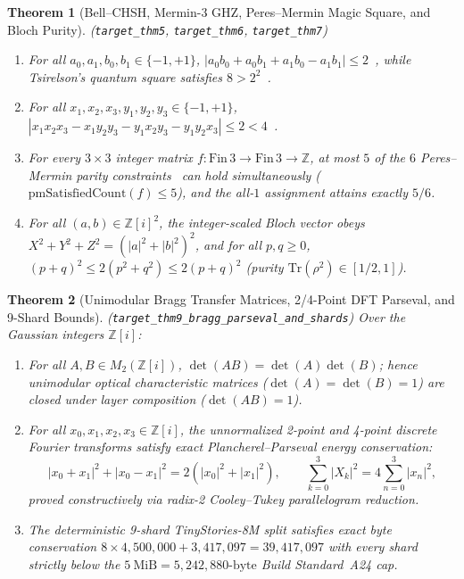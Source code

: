 \documentclass[11pt,a4paper]{amsart}
\newcommand{\code}[1]{{\small\nolinkurl{#1}}}
\newtheorem{theorem}{Theorem}[section]
\theoremstyle{remark}
\newcommand{\Z}{\mathbb{Z}}
\begin{document}
\begin{theorem}[Bell--CHSH, Mermin-3 GHZ, Peres--Mermin Magic Square, and Bloch Purity]
\label{thm:contextuality}
\textup{(\code{target_thm5}, \code{target_thm6}, \code{target_thm7})}
\begin{enumerate}
  \item For all $a_0, a_1, b_0, b_1 \in \{-1, +1\}$, $|a_0 b_0 + a_0 b_1 + a_1 b_0 - a_1 b_1| \le 2$~\cite{clauser1969chsh},
  while Tsirelson's quantum square satisfies $8 > 2^2$~\cite{cirelson1980quantum}.
  \item For all $x_1, x_2, x_3, y_1, y_2, y_3 \in \{-1, +1\}$,
  $|x_1 x_2 x_3 - x_1 y_2 y_3 - y_1 x_2 y_3 - y_1 y_2 x_3| \le 2 < 4$~\cite{mermin1990extreme}.
  \item For \emph{every} $3\times 3$ integer matrix $f : \mathrm{Fin}\,3 \to \mathrm{Fin}\,3 \to \Z$,
  at most $5$ of the $6$ Peres--Mermin parity constraints~\cite{peres1990incompatible}
  can hold simultaneously ($\mathrm{pmSatisfiedCount}(f) \le 5$), and the all-$1$
  assignment attains exactly $5/6$.
  \item For all $(a, b) \in \Z[i]^2$, the integer-scaled Bloch vector obeys
  $X^2 + Y^2 + Z^2 = (|a|^2 + |b|^2)^2$, and for all $p, q \ge 0$,
  $(p+q)^2 \le 2(p^2 + q^2) \le 2(p+q)^2$ (purity $\mathrm{Tr}(\rho^2) \in [1/2, 1]$).
\end{enumerate}
\end{theorem}

\begin{theorem}[Unimodular Bragg Transfer Matrices, 2/4-Point DFT Parseval, and 9-Shard Bounds]
\label{thm:bragg-parseval}
\textup{(\code{target_thm9_bragg_parseval_and_shards})}
Over the Gaussian integers $\Z[i]$:
\begin{enumerate}
  \item For all $A, B \in M_2(\Z[i])$, $\det(AB) = \det(A)\det(B)$; hence
  unimodular optical characteristic matrices ($\det(A) = \det(B) = 1$) are
  closed under layer composition ($\det(AB) = 1$).
  \item For all $x_0, x_1, x_2, x_3 \in \Z[i]$, the unnormalized 2-point and
  4-point discrete Fourier transforms satisfy exact Plancherel--Parseval energy
  conservation:
  \[
    |x_0+x_1|^2 + |x_0-x_1|^2 = 2(|x_0|^2 + |x_1|^2), \qquad
    \sum_{k=0}^{3} |X_k|^2 = 4 \sum_{n=0}^{3} |x_n|^2,
  \]
  proved constructively via radix-2 Cooley--Tukey parallelogram reduction.
  \item The deterministic 9-shard TinyStories-8M split satisfies exact byte
  conservation $8 \times 4{,}500{,}000 + 3{,}417{,}097 = 39{,}417{,}097$ with
  every shard strictly below the $5~\text{MiB} = 5{,}242{,}880\text{-byte}$
  Build Standard~A24 cap.
\end{enumerate}
\end{theorem}
\end{document}
